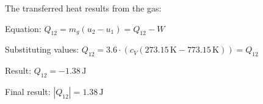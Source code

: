 The transferred heat results from the gas:  

Equation:  
\( Q_{12} = m_g (u_2 - u_1) = Q_{12} - W \)  

Substituting values:  
\( Q_{12} = 3.6 \cdot (c_V (273.15 \, \text{K} - 773.15 \, \text{K})) = Q_{12} \)  

Result:  
\( Q_{12} = -1.38 \, \text{J} \)  

Final result:  
\( |Q_{12}| = 1.38 \, \text{J} \)